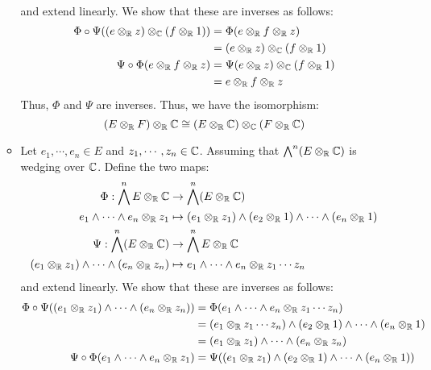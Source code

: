 \documentclass[12pt]{article}
\begin{document}
\begin{solu}
\begin{enumerate}
\begin{itemize}
\begin{align*}
            \end{align*} 
            and extend linearly. We show that these are inverses as follows:
            \begin{align*}
                \Phi \circ \Psi( (e \otimes_\mathbb R z) \otimes_\mathbb C (f \otimes_\mathbb R 1)) &=  \Phi(e \otimes_\mathbb R f \otimes_\mathbb R z) \\ 
                &= (e \otimes_\mathbb R z) \otimes_\mathbb C (f \otimes_\mathbb R 1)\\ 
                \Psi \circ \Phi(e \otimes_\mathbb R f \otimes_\mathbb R z) &= \Psi(e \otimes_\mathbb R z) \otimes_\mathbb C (f \otimes_\mathbb R 1) \\
                &= e \otimes_\mathbb R f \otimes_\mathbb R z
            \end{align*}
            Thus, $\Phi$ and $\Psi$ are inverses. Thus, we have the isomorphism:
            \[ (E \otimes_\mathbb R F) \otimes_\mathbb R \mathbb C \cong  (E \otimes_\mathbb R \mathbb C) \otimes_\mathbb C (F \otimes_\mathbb R \mathbb C) \]
            \item Let $e_1, \cdots, e_n \in E$ and $z_1, \cdots, z_n \in \mathbb C$. Assuming that $\bigwedge^n (E \otimes_\mathbb R \mathbb C)$ is wedging over $\mathbb C$. Define the two maps: 
            \begin{align*}
                \Phi: \bigwedge^n E \otimes_\mathbb R \mathbb C &\to \bigwedge^n (E \otimes_\mathbb R \mathbb C)\\
                e_1 \wedge \cdots \wedge e_n \otimes_\mathbb R z_1 &\mapsto (e_1 \otimes_\mathbb R z_1) \wedge (e_2 \otimes_\mathbb R 1) \wedge \cdots \wedge (e_n \otimes_\mathbb R 1) \\
                \Psi: \bigwedge^n (E \otimes_\mathbb R \mathbb C)  &\to \bigwedge^n E \otimes_\mathbb R \mathbb C \\
                (e_1 \otimes_\mathbb R z_1) \wedge \cdots \wedge (e_n \otimes_\mathbb R z_n) &\mapsto e_1 \wedge \cdots \wedge e_n \otimes_\mathbb R z_1 \cdots z_n
            \end{align*} 
            and extend linearly. We show that these are inverses as follows:
            \begin{align*}
                \Phi \circ \Psi( (e_1 \otimes_\R z_1) \wedge \cdots \wedge (e_n \otimes_\R z_n) ) &=  \Phi(e_1 \wedge \cdots \wedge e_n \otimes_\R z_1 \cdots z_n) \\ 
                &= (e_1 \otimes_\R z_1\cdots z_n) \wedge (e_2 \otimes_\R 1) \wedge  \cdots \wedge (e_n \otimes_\R 1)\\ 
                &= (e_1 \otimes_\R z_1) \wedge \cdots \wedge (e_n \otimes_\R z_n)\\ 
                \Psi \circ \Phi(e_1 \wedge \cdots \wedge e_n \otimes_\R z_1) &= \Psi((e_1 \otimes_\R z_1) \wedge (e_2 \otimes_\R 1) \wedge  \cdots \wedge (e_n \otimes_\R 1)) \\

\end{align*}
\end{itemize}
\end{enumerate}
\end{solu}
\end{document}
